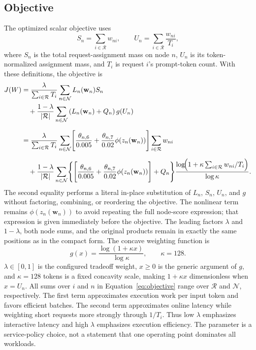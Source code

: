 \documentclass[10pt]{article}
\begin{document}
\subsection{Objective}

The optimized scalar objective uses
\begin{equation*}
  S_n=\sum_{i\in\mathcal{R}}w_{ni},
  \qquad
  U_n=\sum_{i\in\mathcal{R}}\frac{w_{ni}}{T_i},
\end{equation*}
where $S_n$ is the total request-assignment mass on node $n$, $U_n$ is its
token-normalized assignment mass, and $T_i$ is request $i$'s prompt-token
count. With these definitions, the objective is
\begin{equation}
\begin{aligned}
J(W)
  &=\frac{\lambda}{\sum_{i\in\mathcal{R}}T_i}
      \sum_{n\in\mathcal{N}}L_n(\mathbf{w}_n)S_n \\
  &\quad+\frac{1-\lambda}{|\mathcal{R}|}
      \sum_{n\in\mathcal{N}}
      \left(L_n(\mathbf{w}_n)+Q_n\right)g(U_n) \\[0.7em]
  &=\frac{\lambda}{\sum_{i\in\mathcal{R}}T_i}
    \sum_{n\in\mathcal{N}}
    \Biggl[\frac{\theta_{n,6}}{0.005}
      +\frac{\theta_{n,7}}{0.02}
       \phi\!\left(z_n(\mathbf{w}_n)\right)\Biggr]
    \sum_{i\in\mathcal{R}}w_{ni} \\[0.6em]
  &\quad+\frac{1-\lambda}{|\mathcal{R}|}
    \sum_{n\in\mathcal{N}}\Biggl\{
    \Biggl[\frac{\theta_{n,6}}{0.005}
      +\frac{\theta_{n,7}}{0.02}
       \phi\!\left(z_n(\mathbf{w}_n)\right)\Biggr]+Q_n\Biggr\}
      \frac{\log\!\Bigl(1+\kappa
        \sum_{i\in\mathcal{R}}w_{ni}/T_i\Bigr)}{\log\kappa}
    .
\end{aligned}
\label{eq:objective}
\end{equation}
The second equality performs a literal in-place substitution of $L_n$, $S_n$,
$U_n$, and $g$ without factoring, combining, or reordering the objective. The
nonlinear term remains $\phi(z_n(\mathbf{w}_n))$ to avoid repeating the full
node-score expression; that expression is given immediately before the
objective. The leading factors $\lambda$ and $1-\lambda$, both node sums, and
the original products remain in exactly the same positions as in the compact
form.
The concave weighting function is
\begin{equation}
  g(x)=\frac{\log(1+\kappa x)}{\log\kappa},\qquad \kappa=128.
\label{eq:concave}
\end{equation}
$\lambda\in[0,1]$ is the configured tradeoff weight, $x\geq 0$ is the generic
argument of $g$, and $\kappa=128$ tokens is a fixed concavity scale, making
$1+\kappa x$ dimensionless when $x=U_n$. All sums over $i$ and $n$ in
Equation~\ref{eq:objective} range over $\mathcal{R}$ and $\mathcal{N}$,
respectively. The first term approximates execution work per input token and favors
efficient batches. The second term approximates online latency while weighting
short requests more strongly through $1/T_i$. Thus low $\lambda$ emphasizes
interactive latency and high $\lambda$ emphasizes execution efficiency. The
parameter is a service-policy choice, not a statement that one operating point
dominates all workloads.
\end{document}
